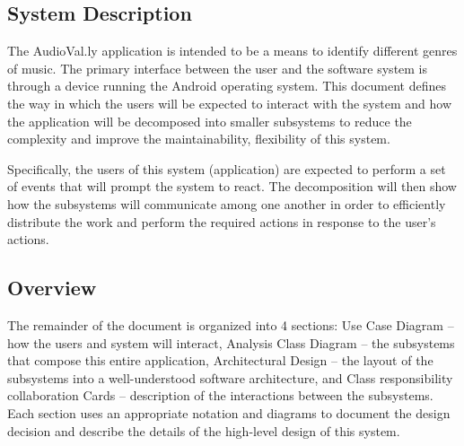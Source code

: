 \documentclass[]{article}
\begin{document}
\subsection{System Description}
\label{sub:system_description}
The AudioVal.ly application is intended to be a means to identify different genres of music.
The primary interface between the user and the software system is through a device running the Android operating system. This document defines the way in which the users will be expected to interact with the system and how the application will be decomposed into smaller subsystems to reduce the complexity and improve the maintainability, flexibility of this system.

Specifically, the users of this system (application) are expected to perform a set of events that will prompt the system to react. The decomposition will then show how the subsystems will communicate among one another in order to efficiently distribute the work and perform the required actions in response to the user's actions.


\subsection{Overview}
\label{sub:overview}
The remainder of the document is organized into 4 sections: Use Case Diagram -- how the users and system will interact, Analysis Class Diagram -- the subsystems that compose this entire application, Architectural Design -- the layout of the subsystems into a well-understood software architecture, and Class responsibility collaboration Cards -- description of the interactions between the subsystems. Each section uses an appropriate notation and diagrams
to document the design decision and describe the details of the high-level design of this system.


\newpage
\end{document}
